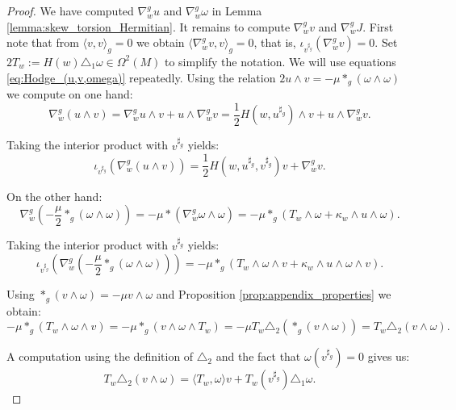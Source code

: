 \documentclass[10pt,a4paper,twoside,reqno]{amsart}
\theoremstyle{plain}
\theoremstyle{definition}
\theoremstyle{remark}
\newcommand{\escal}[1]{\langle#1\rangle}
\begin{document}
\begin{proof}
We have computed $\nabla^g_wu$ and $\nabla^g_w\omega$ in Lemma \ref{lemma:skew_torsion_Hermitian}. It remains to compute $\nabla^g_w v$ and $\nabla^g_w J$. First note that from $\escal{v,v}_g=0$ we obtain $\escal{\nabla_w^g v,v}_g=0$, that is, $\iota_{v^{\sharp_g}}(\nabla^g_wv)=0$. Set $2T_w:=H(w)\triangle_1\omega\in\Omega^2(M)$ to simplify the notation. We will use equations \eqref{eq:Hodge_(u,v,omega)} repeatedly. Using the relation $2 u\wedge v=-\mu \ast_g(\omega\wedge\omega)$ we compute on one hand: $$\nabla^g_w(u\wedge v)=\nabla^g_wu\wedge v+u\wedge\nabla^g_wv=\frac{1}{2}H(w,u^{\sharp_g})\wedge v+u\wedge\nabla^g_wv.$$
    
    Taking the interior product with $v^{\sharp_g}$ yields: $$\iota_{v^{\sharp_g}}(\nabla^g_w(u\wedge v))=\frac{1}{2}H(w,u^{\sharp_g},v^{\sharp_g})v+\nabla^g_wv.$$

    On the other hand: $$\nabla^g_w(-\frac{\mu}{2}*_g(\omega\wedge\omega))=-\mu*(\nabla^g_w\omega\wedge\omega)=-\mu*_g(T_w\wedge\omega+\kappa_w\wedge u\wedge\omega).$$
    
    Taking the interior product with $v^{\sharp_g}$ yields: $$\iota_{v^{\sharp_g}}(\nabla^g_w(-\frac{\mu}{2}*_g(\omega\wedge\omega)))=-\mu*_g(T_w\wedge\omega\wedge v+\kappa_w\wedge u\wedge\omega\wedge v).$$
    
    Using $*_g(v\wedge\omega)=-\mu v\wedge\omega$ and Proposition \ref{prop:appendix_properties} we obtain: $$-\mu*_g(T_w\wedge\omega\wedge v)=-\mu*_g(v\wedge\omega\wedge T_w)=-\mu T_w\triangle_2(*_g(v\wedge\omega))=T_w\triangle_2(v\wedge\omega).$$

    A computation using the definition of $\triangle_2$ and the fact that $\omega(v^{\sharp_g})=0$ gives us: $$T_w\triangle_2(v\wedge\omega)=\escal{T_w,\omega}v+T_w(v^{\sharp_g})\triangle_1\omega.$$


\end{proof}
\end{document}

